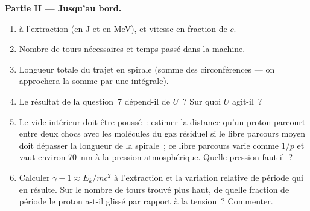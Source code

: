 \begin{problem}
\medskip
\noindent\textbf{Partie II --- Jusqu'au bord.}
\begin{enumerate}[resume]
  \item {} à l'extraction (en J et en MeV), et vitesse en
        fraction de $c$.
  \item Nombre de tours nécessaires et temps passé dans la machine.
  \item Longueur totale du trajet en spirale (somme des circonférences
        --- on approchera la somme par une intégrale).
  \item Le résultat de la question~7 dépend-il de $U$~? Sur quoi $U$
        agit-il~?
  \item Le vide intérieur doit être poussé~: estimer la distance qu'un
        proton parcourt entre deux chocs avec les molécules du gaz
        résiduel si le libre parcours moyen doit dépasser la longueur de
        la spirale~; ce libre parcours varie comme $1/p$ et vaut environ
        \qty{70}{nm} à la pression atmosphérique. Quelle pression faut-il~?
  \item Calculer $\gamma - 1 \approx E_k/mc^2$ à l'extraction et la
        variation relative de période qui en résulte. Sur le nombre de
        tours trouvé plus haut, de quelle fraction de période le proton
        a-t-il glissé par rapport à la tension~? Commenter.
\end{enumerate}


\end{problem}

